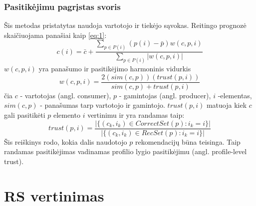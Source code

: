 \documentclass{VUMIFInfMagistrinis}
\begin{document}
\subsubsection{Pasitikėjimu pagrįstas svoris}
Šis metodas pristatytas \cite{12} naudoja vartotojo ir tiekėjo sąvokas. Reitingo prognozė skaičiuojama panašiai kaip \eqref{eq:1}:
\begin{equation}
c(i) = \bar{c}+\frac{\sum \limits_{p \in P(i)} (p(i) - \bar{p}) w(c,p,i)}{\sum \limits_{p \in P(i)} |w(c,p,i)|}
\end{equation}
$w(c,p,i)$ yra panašumo ir pasitikėjimo harmoninis vidurkis 
\begin{equation}
w(c,p,i) = \frac{2(sim(c,p))(trust(p,i))}{sim(c,p)+trust(p,i)}
\end{equation}
čia $c$ - vartotojas (angl. consumer), $p$ - gamintojas (angl. producer), $i$ -elementas, $sim(c, p)$ - panašumas tarp vartotojo ir gamintojo. $trust(p,i)$ matuoja kiek $c$ gali pasitikėti $p$ elemento $i$ vertinimu ir yra randamas taip:
\begin{equation}
trust(p,i)=\frac{|\{(c_k, i_k) \in CorrectSet(p): i_k = i\}|}{|\{(c_k,i_k) \in RecSet(p): i_k=i\}|}
\end{equation}
Šis reiškinys rodo, kokia dalis naudotojo $p$ rekomendacijų būna teisinga. Taip randamas pasitikėjimas vadinamas profilio lygio pasitikėjimu (angl. profile-level trust).
\section{RS vertinimas}
\end{document}
